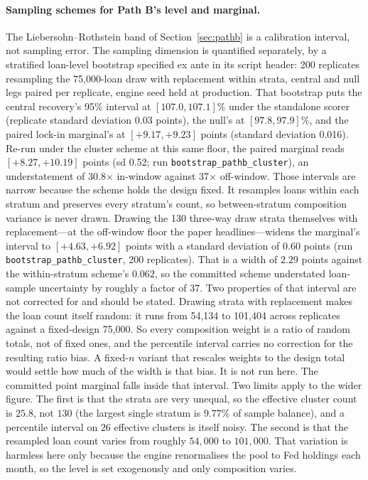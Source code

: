 \documentclass[12pt]{article}
\begin{document}
\paragraph{Sampling schemes for Path B's level and marginal.}
The Liebersohn--Rothstein band of Section~\ref{sec:pathb} is a calibration interval, not sampling error. The sampling dimension is quantified separately, by a stratified loan-level bootstrap specified ex ante in its script header: 200 replicates resampling the 75,000-loan draw with replacement within strata, central and null legs paired per replicate, engine seed held at production. That bootstrap puts the central recovery's 95\% interval at $[107.0, 107.1]\%$ under the standalone scorer (replicate standard deviation 0.03 points), the null's at $[97.8, 97.9]\%$, and the paired lock-in marginal's at $[+9.17, +9.23]$ points (standard deviation 0.016). Re-run under the cluster scheme at this same floor, the paired marginal reads $[+8.27, +10.19]$ points (sd 0.52; run \texttt{bootstrap\_pathb\_cluster}), an understatement of 30.8$\times$ in-window against 37$\times$ off-window. Those intervals are narrow because the scheme holds the design fixed. It resamples loans within each stratum and preserves every stratum's count, so between-stratum composition variance is never drawn. Drawing the 130 three-way draw strata themselves with replacement---at the off-window floor the paper headlines---widens the marginal's interval to $[+4.63, +6.92]$ points with a standard deviation of $0.60$ points (run \texttt{bootstrap\_pathb\_cluster}, 200 replicates). That is a width of $2.29$ points against the within-stratum scheme's $0.062$, so the committed scheme understated loan-sample uncertainty by roughly a factor of $37$. Two properties of that interval are not corrected for and should be stated. Drawing strata with replacement makes the loan count itself random: it runs from 54,134 to 101,404 across replicates against a fixed-design 75,000. So every composition weight is a ratio of random totals, not of fixed ones, and the percentile interval carries no correction for the resulting ratio bias. A fixed-$n$ variant that rescales weights to the design total would settle how much of the width is that bias. It is not run here. The committed point marginal falls inside that interval. Two limits apply to the wider figure. The first is that the strata are very unequal, so the effective cluster count is $25.8$, not $130$ (the largest single stratum is $9.77\%$ of sample balance), and a percentile interval on $26$ effective clusters is itself noisy. The second is that the resampled loan count varies from roughly $54{,}000$ to $101{,}000$. That variation is harmless here only because the engine renormalises the pool to Fed holdings each month, so the level is set exogenously and only composition varies.
\end{document}
